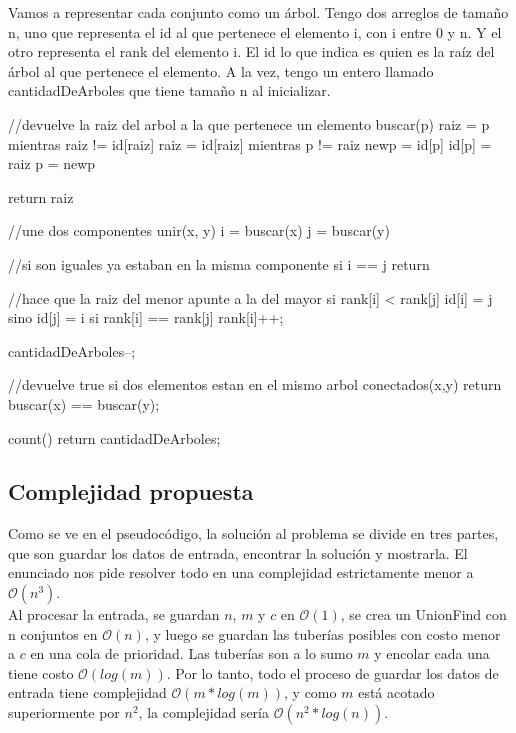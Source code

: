 \begin{codesnippet}
Vamos a representar cada conjunto como un árbol.
Tengo dos arreglos de tamaño n, uno que representa el id al que pertenece el elemento i,
con i entre 0 y n. Y el otro representa el rank del elemento i.
El id lo que indica es quien es la raíz del árbol al que pertenece el elemento.
A la vez, tengo un entero llamado cantidadDeArboles que tiene tamaño n al inicializar.

//devuelve la raiz del arbol a la que pertenece un elemento
buscar(p)
  raiz = p
  mientras raiz != id[raiz]
  	raiz = id[raiz]
  mientras p != raiz
  	newp = id[p]
  	id[p] = raiz
  	p = newp

  return raiz

//une dos componentes
unir(x, y)
  i = buscar(x)
  j = buscar(y)

  //si son iguales ya estaban en la misma componente
  si i == j return

  //hace que la raiz del menor apunte a la del mayor
  si rank[i] < rank[j]
    id[i] = j
  sino
   id[j] = i
   si rank[i] == rank[j]
    rank[i]++;


  cantidadDeArboles--;


//devuelve true si dos elementos estan en el mismo arbol
conectados(x,y)
   return buscar(x) == buscar(y);


count()
	return cantidadDeArboles;

\end{codesnippet}



\subsection{Complejidad propuesta}

Como se ve en el pseudocódigo, la solución al problema se divide en tres partes, que son guardar los datos de entrada, encontrar la solución y mostrarla. El enunciado nos pide resolver todo en una complejidad estrictamente menor a  $\mathcal{O}(n^{3})$. \\

Al procesar la entrada, se guardan $n$, $m$ y $c$ en $\mathcal{O}(1)$, se crea un UnionFind con n conjuntos en $\mathcal{O}(n)$, y luego se guardan las tuberías posibles con costo menor a $c$ en una cola de prioridad. Las tuberías son a lo sumo $m$ y encolar cada una tiene costo $\mathcal{O}(log(m))$. Por lo tanto, todo el proceso de guardar los datos de entrada tiene complejidad $\mathcal{O}(m*log(m))$, y como $m$ está acotado superiormente por $n^2$, la complejidad sería $\mathcal{O}(n^2*log(n))$. \\

